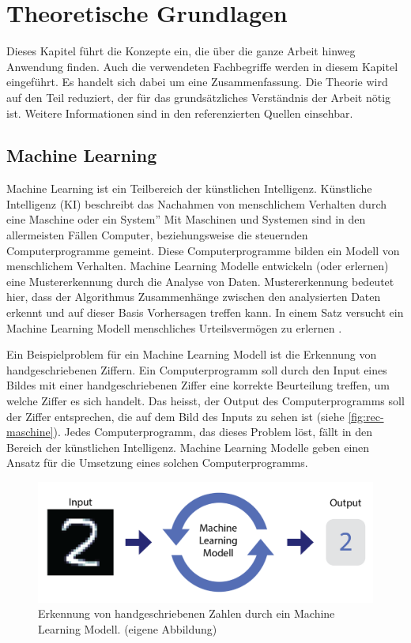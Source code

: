 \chapter{Theoretische Grundlagen}\label{chap:t}
Dieses Kapitel führt die Konzepte ein, die über die ganze Arbeit hinweg
Anwendung finden. Auch die verwendeten Fachbegriffe werden in diesem Kapitel
eingeführt. Es handelt sich dabei um eine Zusammenfassung. Die Theorie wird auf den
Teil reduziert, der für das grundsätzliches Verständnis der Arbeit nötig ist.
Weitere Informationen sind in den referenzierten Quellen einsehbar.
 
\section{Machine Learning}\label{chap:t_ml} Machine Learning ist ein Teilbereich
der künstlichen Intelligenz. Künstliche Intelligenz (KI) beschreibt das
Nachahmen von menschlichem Verhalten durch eine Maschine oder ein System''
\cite{noauthor_oxford_nodate} Mit Maschinen und Systemen sind in den allermeisten
Fällen Computer, beziehungsweise die steuernden Computerprogramme gemeint. Diese
Computerprogramme bilden ein Modell von menschlichem Verhalten. Machine Learning
Modelle entwickeln (oder erlernen) eine Mustererkennung durch die Analyse von
Daten. Mustererkennung bedeutet hier, dass der Algorithmus Zusammenhänge
zwischen den analysierten Daten erkennt und auf dieser Basis Vorhersagen treffen
kann. In einem Satz versucht ein Machine Learning Modell menschliches
Urteilsvermögen zu erlernen \cite{spaulding_is_2020}.
 
Ein Beispielproblem für ein Machine Learning Modell ist die Erkennung von
handgeschriebenen Ziffern. Ein Computerprogramm soll durch den Input eines
Bildes mit einer handgeschriebenen Ziffer eine korrekte Beurteilung treffen, um
welche Ziffer es sich handelt. Das heisst, der Output des Computerprogramms soll
der Ziffer entsprechen, die auf dem Bild des Inputs zu sehen ist (siehe
\autoref{fig:rec-maschine}). Jedes Computerprogramm, das dieses Problem löst,
fällt in den Bereich der künstlichen Intelligenz. Machine Learning Modelle geben
einen Ansatz für die Umsetzung eines solchen Computerprogramms.
 
\begin{figure}[!ht]
   \centering
   \includegraphics[width=\textwidth]{images/theorie/rec-maschine.png}
   \caption{Erkennung von handgeschriebenen Zahlen durch ein Machine Learning Modell. (eigene Abbildung)}\label{fig:rec-maschine}
\end{figure}
 
